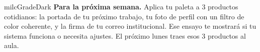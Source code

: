 \documentclass[11pt,letterpaper]{article}
\begin{document}
\begin{infoband}{milcGradeDark}
\textbf{Para la próxima semana.} Aplica tu paleta a 3 productos cotidianos: la portada de tu próximo trabajo, tu foto de perfil con un filtro de color coherente, y la firma de tu correo institucional. Ese ensayo te mostrará si tu sistema funciona o necesita ajustes. El próximo lunes traes esos 3 productos al aula.
\end{infoband}
\end{document}
